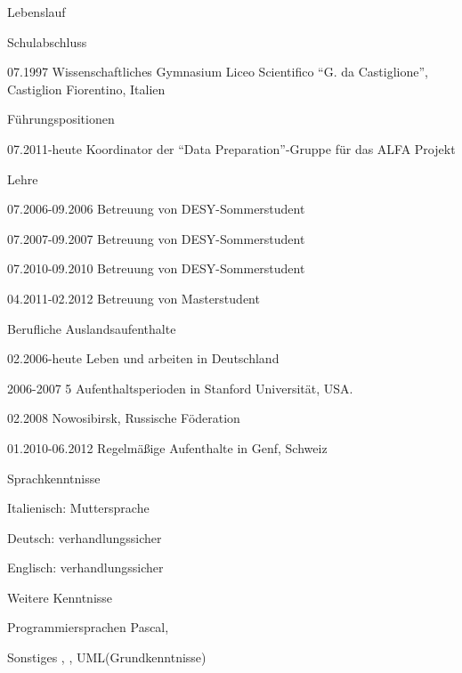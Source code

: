 \documentclass[11pt,a4paper]{scrartcl}
\newcommand{\versal}[1]{\textsf{\textsmaller{\MakeUppercase{\caps{#1}}}}\xspace}
\newcommand*{\ac}[1]{\versal{#1}}
\begin{document}
\begin{cv}{Lebenslauf}
\begin{cvlist}{Schulabschluss}
\item[07.1997] Wissenschaftliches Gymnasium Liceo Scientifico "`G. da
Castiglione"', Castiglion Fiorentino, Italien
\end{cvlist}

\begin{cvlist}{F\"uhrungspositionen}
\item [07.2011-heute] Koordinator der "`Data Preparation"'-Gruppe
f\"ur das ALFA Projekt
\end{cvlist}

\begin{cvlist}{Lehre}
\item [07.2006-09.2006] Betreuung von DESY-Sommerstudent
\item [07.2007-09.2007] Betreuung von DESY-Sommerstudent
\item [07.2010-09.2010] Betreuung von DESY-Sommerstudent
\item [04.2011-02.2012] Betreuung von Masterstudent
\end{cvlist}

\begin{cvlist}{Berufliche Auslandsaufenthalte}
\item [02.2006-heute] Leben und arbeiten in Deutschland
\item [2006-2007] 5 Aufenthaltsperioden in Stanford Universit\"at, USA.
\item [02.2008] Nowosibirsk, Russische F\"oderation
\item [01.2010-06.2012] Regelm\"a{\ss}ige Aufenthalte in Genf, Schweiz
\end{cvlist}

\begin{cvlist}{Sprachkenntnisse}
\item Italienisch: Muttersprache
\item Deutsch: verhandlungssicher
\item Englisch: verhandlungssicher
\end{cvlist}

\begin{cvlist}{Weitere \ac{EDV} Kenntnisse}
\item[Programmiersprachen] Pascal, \ac{BASIC}
\item[Sonstiges] \ac{MS OFFICE}, \ac{\LaTeX}, UML(Grundkenntnisse)
\end{cvlist}


\end{cv}
\end{document}
